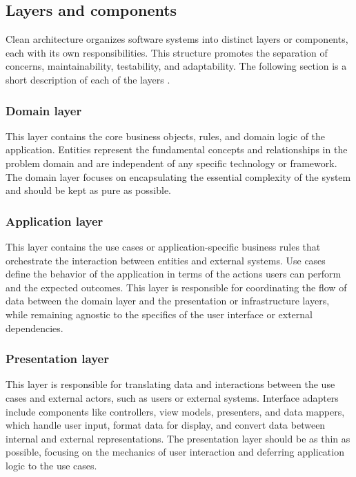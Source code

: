 \subsection{Layers and components} \label{subsec:layers}

Clean architecture organizes software systems into distinct layers or components, each
with its own responsibilities. This structure promotes the separation of concerns,
maintainability, testability, and adaptability. The following section is a short
description of each of the layers \parencite{robert_c_martin_clean_2018}.

\subsubsection*{Domain layer}
This layer contains the core business objects, rules, and domain logic of the application.
Entities represent the fundamental concepts and relationships in the problem domain and
are independent of any specific technology or framework. The domain layer focuses on
encapsulating the essential complexity of the system and should be kept as pure as
possible.

\subsubsection*{Application layer}
This layer contains the use cases or application-specific
business rules that orchestrate the interaction between entities and external systems. Use
cases define the behavior of the application in terms of the actions users can perform and
the expected outcomes. This layer is responsible for coordinating the flow of data between
the domain layer and the presentation or infrastructure layers, while remaining agnostic
to the specifics of the user interface or external dependencies.

\subsubsection*{Presentation layer}
This layer is responsible for translating data and interactions between the use cases and
external actors, such as users or external systems. Interface adapters include components
like controllers, view models, presenters, and data mappers, which handle user input,
format data for display, and convert data between internal and external representations.
The presentation layer should be as thin as possible, focusing on the mechanics of user
interaction and deferring application logic to the use cases.

